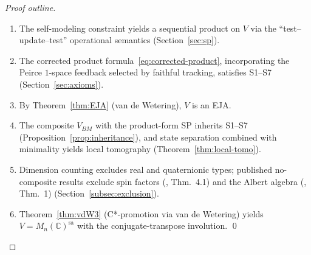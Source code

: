 \begin{proof}[Proof outline]
\mbox{}%
\begin{enumerate}
\item The self-modeling constraint yields a sequential product on
  $V$ via the ``test--update--test'' operational
  semantics (Section~\ref{sec:sp}).
\item The corrected product formula~\eqref{eq:corrected-product},
  incorporating the Peirce $1$-space feedback selected by faithful
  tracking, satisfies S1--S7
  (Section~\ref{sec:axioms}).
\item By Theorem~\ref{thm:EJA} (van de Wetering), $V$ is an EJA.
\item The composite $V_{BM}$ with the product-form SP inherits
  S1--S7 (Proposition~\ref{prop:inheritance}), and state
  separation combined with minimality yields local tomography
  (Theorem~\ref{thm:local-tomo}).
\item Dimension counting excludes real and quaternionic types;
  published no-composite results exclude spin factors
  (\cite{BarnumWilce2014}, Thm.~4.1) and the Albert algebra
  (\cite{BarnumUdudeckVdW2020}, Thm.~1)
  (Section~\ref{subsec:exclusion}).
\item Theorem~\ref{thm:vdW3} (C*-promotion via van de Wetering)
  yields $V = M_n(\mathbb{C})^{\mathrm{sa}}$ with the
  conjugate-transpose involution. \qed
\end{enumerate}
\end{proof}
